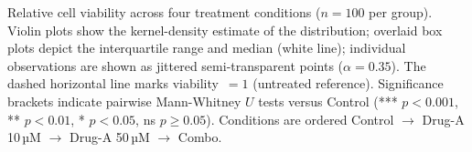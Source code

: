 \caption{Relative cell viability across four treatment conditions ($n=100$ per group).
Violin plots show the kernel-density estimate of the distribution; overlaid box plots
depict the interquartile range and median (white line); individual observations are
shown as jittered semi-transparent points ($\alpha=0.35$).
The dashed horizontal line marks viability~$=1$ (untreated reference).
Significance brackets indicate pairwise Mann-Whitney $U$ tests versus Control
(*** $p<0.001$, ** $p<0.01$, * $p<0.05$, ns $p\geq0.05$).
Conditions are ordered Control $\to$ Drug-A 10\,µM $\to$ Drug-A 50\,µM $\to$ Combo.}
